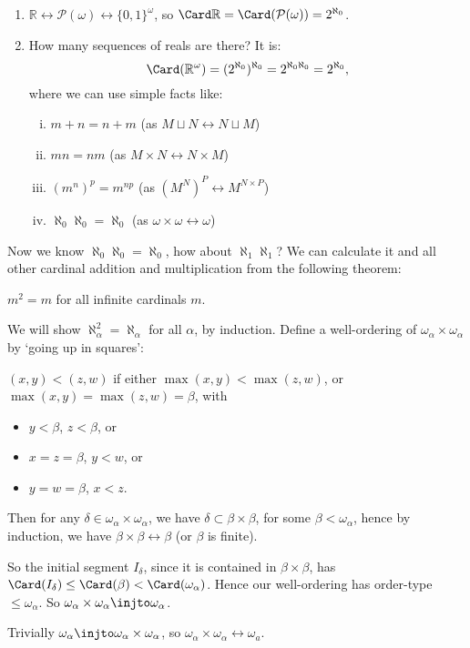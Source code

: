 \documentclass[12pt]{article}
\begin{document}
\begin{exbox}
	\begin{enumerate}
		\item $\mathbb{R} \leftrightarrow \mathcal{P}(\omega) \leftrightarrow \{0, 1\}^{\omega}$, so $\Card \mathbb{R} = \Card (\mathcal{P}(\omega)) = 2^{\aleph_0}$.
		\item How many sequences of reals are there? It is:
			\[
			\Card (\mathbb{R}^{\omega}) = (2^{\aleph_0})^{\aleph_0} = 2^{\aleph_0 \aleph_0} = 2^{\aleph_0},
			\]
			where we can use simple facts like:
			\begin{enumerate}[(i)]
				\item $m + n = n + m$ (as $M \sqcup N \leftrightarrow N \sqcup M$)
				\item $mn = nm$ (as $M \times N \leftrightarrow N \times M$)
				\item $(m^{n})^{p} = m^{np}$ (as $(M^{N})^{P} \leftrightarrow M^{N \times P}$)
				\item $\aleph_0 \aleph_0 = \aleph_0$ (as $\omega \times \omega \leftrightarrow \omega$)
			\end{enumerate}	
	\end{enumerate}
\end{exbox}
Now we know $\aleph_0 \aleph_0 = \aleph_0$, how about $\aleph_1 \aleph_1$? We can calculate it and all other cardinal addition and multiplication from the following theorem:
\begin{theorem}
	$m^2 = m$ for all infinite cardinals $m$.
\end{theorem}

\begin{proofbox}
	We will show $\aleph_\alpha^2 = \aleph_\alpha$ for all $\alpha$, by induction. Define a well-ordering of $\omega_\alpha \times \omega_\alpha$ by `going up in squares':

	$(x, y) < (z, w)$ if either $\max(x, y) < \max(z, w)$, or $\max(x, y) = \max(z, w) = \beta$, with
	\begin{itemize}
		\item $y < \beta$, $z < \beta$, or
		\item $x = z = \beta$, $y < w$, or
		\item $y = w = \beta$, $x < z$.
	\end{itemize}

	Then for any $\delta \in \omega_\alpha \times \omega_\alpha$, we have $\delta \subset \beta \times \beta$, for some $\beta < \omega_\alpha$, hence by induction, we have $\beta \times \beta \leftrightarrow \beta$ (or $\beta$ is finite).

	So the initial segment $I_\delta$, since it is contained in $\beta \times \beta$, has $\Card(I_\delta) \le \Card(\beta) < \Card (\omega_\alpha)$. Hence our well-ordering has order-type $\le \omega_\alpha$. So $\omega_\alpha \times \omega_\alpha \injto \omega_\alpha$.

	Trivially $\omega_\alpha \injto \omega_\alpha \times \omega_\alpha$, so $\omega_\alpha \times \omega_\alpha \leftrightarrow \omega_a$.
\end{proofbox}
\end{document}
